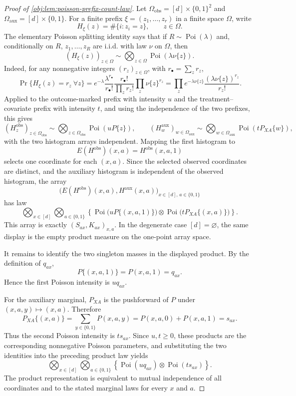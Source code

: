 \begin{proof}[Proof of \cref{obj:lem:poisson-prefix-count-law}]
Let \(\Omega_{\mathrm{obs}}=[d]\times\{0,1\}^2\) and
\(\Omega_{\mathrm{aux}}=[d]\times\{0,1\}\).  For a finite prefix
\(\xi=(z_1,\ldots,z_r)\) in a finite space \(\Omega\), write
\[
H_\xi(z)=\#\{i:z_i=z\},\qquad z\in\Omega .
\]
The elementary Poisson splitting identity says that if \(R\sim\operatorname{Poi}(\lambda)\)
and, conditionally on \(R\), \(z_1,\ldots,z_R\) are i.i.d. with law \(\nu\) on
\(\Omega\), then
\[
(H_\xi(z))_{z\in\Omega}\sim \bigotimes_{z\in\Omega}\operatorname{Poi}(\lambda\nu\{z\}).
\]
Indeed, for any nonnegative integers \((r_z)_{z\in\Omega}\), with
\(r_\bullet=\sum_z r_z\),
\[
\Pr\{H_\xi(z)=r_z\ \forall z\}
=e^{-\lambda}\frac{\lambda^{r_\bullet}}{r_\bullet!}
\frac{r_\bullet!}{\prod_z r_z!}\prod_z \nu\{z\}^{r_z}
=\prod_z e^{-\lambda\nu\{z\}}\frac{(\lambda\nu\{z\})^{r_z}}{r_z!}.
\]
Applied to the outcome-marked prefix with intensity \(u\) and the treatment--covariate
prefix with intensity \(t\), and using the independence of the two prefixes, this gives
\[
(H^{\mathrm{obs}}_z)_{z\in\Omega_{\mathrm{obs}}}
\sim
\bigotimes_{z\in\Omega_{\mathrm{obs}}}\operatorname{Poi}(uP\{z\}),
\qquad
(H^{\mathrm{aux}}_w)_{w\in\Omega_{\mathrm{aux}}}
\sim
\bigotimes_{w\in\Omega_{\mathrm{aux}}}\operatorname{Poi}(tP_{XA}\{w\}),
\]
with the two histogram arrays independent.  Mapping the first histogram to
\[
E(H^{\mathrm{obs}})(x,a)=H^{\mathrm{obs}}(x,a,1)
\]
selects one coordinate for each \((x,a)\).  Since the selected observed coordinates are
distinct, and the auxiliary histogram is independent of the observed histogram, the
array
\[
\bigl(E(H^{\mathrm{obs}})(x,a),H^{\mathrm{aux}}(x,a)\bigr)_{x\in[d],\,a\in\{0,1\}}
\]
has law
\[
\bigotimes_{x\in[d]}\bigotimes_{a\in\{0,1\}}
\left\{\operatorname{Poi}\bigl(uP\{(x,a,1)\}\bigr)
\otimes
\operatorname{Poi}\bigl(tP_{XA}\{(x,a)\}\bigr)\right\}.
\]
This array is exactly \((S_{ax},K_{ax})_{x,a}\).  In the degenerate case
\([d]=\varnothing\), the same display is the empty product measure on the one-point
array space. %

It remains to identify the two singleton masses in the displayed product.  By the
definition of \(q_{ax}\),
\[
P\{(x,a,1)\}=P(x,a,1)=q_{ax}.
\]
Hence the first Poisson intensity is \(u q_{ax}\). %

For the auxiliary marginal, \(P_{XA}\) is the pushforward of \(P\) under
\((x,a,y)\mapsto(x,a)\).  Therefore
\[
P_{XA}\{(x,a)\}
=\sum_{y\in\{0,1\}}P(x,a,y)
=P(x,a,0)+P(x,a,1)
=s_{ax}.
\]
Thus the second Poisson intensity is \(t s_{ax}\).  Since \(u,t\ge0\), these products
are the corresponding nonnegative Poisson parameters, and substituting the two
identities into the preceding product law yields
\[
\bigotimes_{x\in[d]}\bigotimes_{a\in\{0,1\}}
\left\{\operatorname{Poi}(u q_{ax})\otimes
\operatorname{Poi}(t s_{ax})\right\}.
\]
The product representation is equivalent to mutual independence of all coordinates
and to the stated marginal laws for every \(x\) and \(a\). %
\end{proof}
